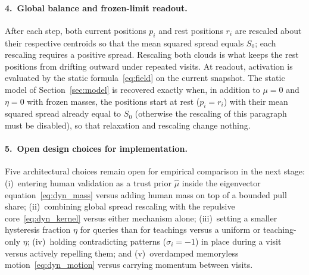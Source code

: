 \documentclass[11pt]{article}
\theoremstyle{remark}
\begin{document}
\paragraph{4.\ Global balance and frozen-limit readout.}
After each step, both current positions $p_i$ and rest positions $r_i$ are rescaled about their respective centroids so that the mean squared spread equals $S_0$; each rescaling requires a positive spread. Rescaling both clouds is what keeps the rest positions from drifting outward under repeated visits. At readout, activation is evaluated by the static formula~\eqref{eq:field} on the current snapshot. The static model of Section~\ref{sec:model} is recovered exactly when, in addition to $\mu=0$ and $\eta=0$ with frozen masses, the positions start at rest ($p_i=r_i$) with their mean squared spread already equal to $S_0$ (otherwise the rescaling of this paragraph must be disabled), so that relaxation and rescaling change nothing.

\paragraph{5.\ Open design choices for implementation.}
Five architectural choices remain open for empirical comparison in the next stage: (i)~entering human validation as a trust prior $\hat{\mu}$ inside the eigenvector equation~\eqref{eq:dyn_mass} versus adding human mass on top of a bounded pull share; (ii)~combining global spread rescaling with the repulsive core~\eqref{eq:dyn_kernel} versus either mechanism alone; (iii)~setting a smaller hysteresis fraction $\eta$ for queries than for teachings versus a uniform or teaching-only $\eta$; (iv)~holding contradicting patterns ($\sigma_i=-1$) in place during a visit versus actively repelling them; and (v)~overdamped memoryless motion~\eqref{eq:dyn_motion} versus carrying momentum between visits.
\end{document}
